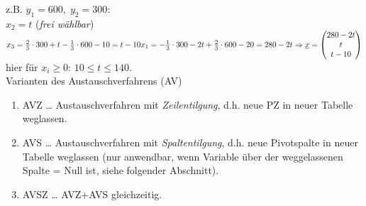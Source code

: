  z.B. $y_1=600,\; y_2=300$:\\
$x_2=t$ (\emph{frei wählbar})\\
$x_3=\frac{2}{3}\cdot 300 + t - \frac{1}{3}\cdot 600 -10 = t-10\\
x_1=-\frac{1}{3}\cdot 300 - 2t + \frac{2}{3}\cdot 600 -20=280-2t\\
\Rightarrow \underline{x}=\begin{pmatrix}
280-2t\\
t\\
t-10
\end{pmatrix}$\\
hier für $x_i\geq 0$: $10\leq t \leq 140$.
\bigskip\\
Varianten des Austauschverfahrens (AV)
\begin{enumerate}
\item AVZ … Austauschverfahren mit \emph{Zeilentilgung}, d.h. neue PZ in neuer Tabelle weglassen.
\item AVS … Austauschverfahren mit \emph{Spaltentilgung}, d.h. neue Pivotspalte in neuer Tabelle weglassen (nur anwendbar, wenn Variable über der weggelassenen Spalte = Null ist, siehe folgender Abschnitt).
\item AVSZ … AVZ+AVS gleichzeitig.
\end{enumerate}

